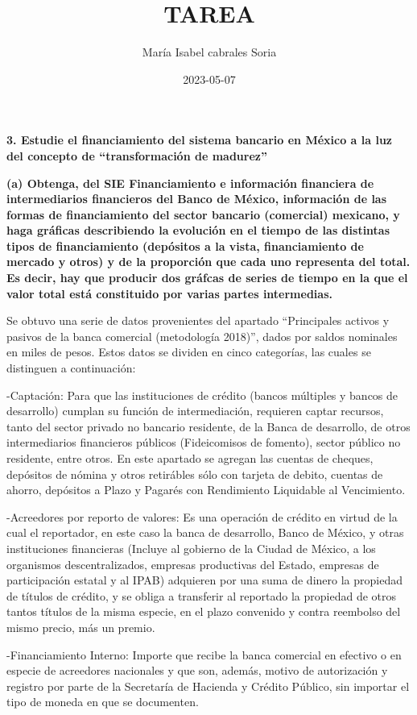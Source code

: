 \documentclass[
  12pt,
]{article}
\title{TAREA}
\author{María Isabel cabrales Soria}
\date{2023-05-07}
\begin{document}
\maketitle

\textbf{3. Estudie el financiamiento del sistema bancario en México a la
luz del concepto de ``transformación de madurez''}

\textbf{(a) Obtenga, del SIE Financiamiento e información financiera de
intermediarios financieros del Banco de México, información de las
formas de financiamiento del sector bancario (comercial) mexicano, y
haga gráficas describiendo la evolución en el tiempo de las distintas
tipos de financiamiento (depósitos a la vista, financiamiento de mercado
y otros) y de la proporción que cada uno representa del total. Es decir,
hay que producir dos gráfcas de series de tiempo en la que el valor
total está constituido por varias partes intermedias.}

Se obtuvo una serie de datos provenientes del apartado ``Principales
activos y pasivos de la banca comercial (metodología 2018)'', dados por
saldos nominales en miles de pesos. Estos datos se dividen en cinco
categorías, las cuales se distinguen a continuación:

-Captación: Para que las instituciones de crédito (bancos múltiples y
bancos de desarrollo) cumplan su función de intermediación, requieren
captar recursos, tanto del sector privado no bancario residente, de la
Banca de desarrollo, de otros intermediarios financieros públicos
(Fideicomisos de fomento), sector público no residente, entre otros. En
este apartado se agregan las cuentas de cheques, depósitos de nómina y
otros retirábles sólo con tarjeta de debito, cuentas de ahorro,
depósitos a Plazo y Pagarés con Rendimiento Liquidable al Vencimiento.

-Acreedores por reporto de valores: Es una operación de crédito en
virtud de la cual el reportador, en este caso la banca de desarrollo,
Banco de México, y otras instituciones financieras (Incluye al gobierno
de la Ciudad de México, a los organismos descentralizados, empresas
productivas del Estado, empresas de participación estatal y al IPAB)
adquieren por una suma de dinero la propiedad de títulos de crédito, y
se obliga a transferir al reportado la propiedad de otros tantos títulos
de la misma especie, en el plazo convenido y contra reembolso del mismo
precio, más un premio.

-Financiamiento Interno: Importe que recibe la banca comercial en
efectivo o en especie de acreedores nacionales y que son, además, motivo
de autorización y registro por parte de la Secretaría de Hacienda y
Crédito Público, sin importar el tipo de moneda en que se documenten.
\end{document}
